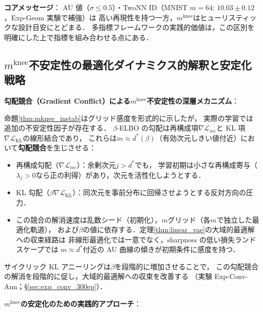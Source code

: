 \documentclass[11pt,a4paper]{jsarticle}
\newcommand{\mknee}{m^{\mathrm{knee}}}
\begin{document}
\textbf{コアメッセージ}：
AU 値（$\sigma \leq 0.5$）・TwoNN ID（MNIST $m=64$: $10.03 \pm 0.12$，Exp-Geom 実験で補強）は
高い再現性を持つ一方，$\mknee$はヒューリスティックな設計目安にとどまる．
多指標フレームワークの実践的価値は，この区別を明確にした上で指標を組み合わせる点にある．

\subsection{$\mknee$不安定性の最適化ダイナミクス的解釈と安定化戦略}\label{sec:disc_mknee_improve}

\textbf{勾配競合（Gradient Conflict）による$\mknee$不安定性の深層メカニズム}：

命題\ref{thm:mknee_instab}はグリッド感度を形式的に示したが，
実際の学習では追加の不安定性因子が存在する．
$\beta$-ELBO の勾配は再構成項$\nabla\mathcal{L}_\mathrm{rec}$と
KL 項$\nabla\mathcal{L}_\mathrm{KL}$の線形結合であり，
これらは$m \approx d^*(\beta)$（有効次元しきい値付近）において\textbf{勾配競合}を生じさせる：

\begin{itemize}
  \item 再構成勾配（$\nabla\mathcal{L}_\mathrm{rec}$）：余剰次元$j > d^*$でも，
        学習初期は小さな再構成寄与（$\lambda_j > 0$なら正の利得）があり，次元を活性化しようとする．
  \item KL 勾配（$\beta\nabla\mathcal{L}_\mathrm{KL}$）：同次元を事前分布に回帰させようとする反対方向の圧力．
  \item この競合の解消速度は乱数シード（初期化），$m$グリッド（各$m$で独立した最適化軌道），
        および$\beta$の値に依存する．定理\ref{thm:linear_vae}の大域的最適解への収束経路は
        非線形最適化では一意でなく，sharpness の低い損失ランドスケープでは
        $m \approx d^*$付近の AU 曲線の傾きが初期条件に感度を持つ．
\end{itemize}

サイクリック KL アニーリング\cite{fu2019cyclical}は$\beta$を段階的に増加させることで，
この勾配競合の解消を段階的に促し，大域的最適解への収束を改善する
（実験 Exp-Conv-Ann；§\ref{sec:exp_conv_300ep}）．

\textbf{$\mknee$の安定化のための実践的アプローチ}：
\end{document}
